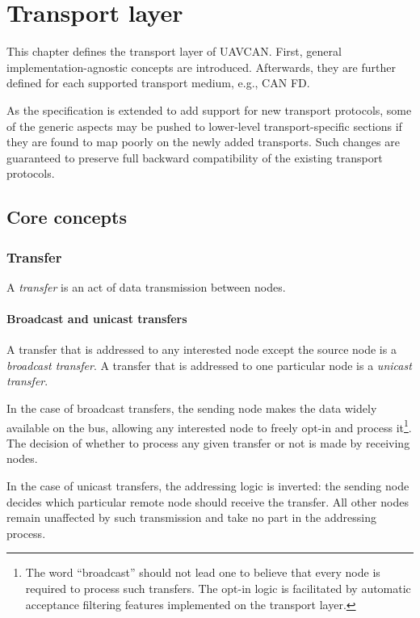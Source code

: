 \chapter{Transport layer}\label{sec:transport_layer}

This chapter defines the transport layer of UAVCAN.
First, general implementation-agnostic concepts are introduced.
Afterwards, they are further defined for each supported transport medium, e.g., CAN FD.

As the specification is extended to add support for new transport protocols,
some of the generic aspects may be pushed to lower-level transport-specific sections
if they are found to map poorly on the newly added transports.
Such changes are guaranteed to preserve full backward compatibility of the existing transport protocols.

\section{Core concepts}

\subsection{Transfer}

A \emph{transfer} is an act of data transmission between nodes.

\subsubsection{Broadcast and unicast transfers}

A transfer that is addressed to any interested node except the source node is a \emph{broadcast transfer}.
A transfer that is addressed to one particular node is a \emph{unicast transfer}.

In the case of broadcast transfers, the sending node makes the data widely available on the bus,
allowing any interested node to freely opt-in and process
it\footnote{The word ``broadcast'' should not lead one to believe that every node is required to
process such transfers. The opt-in logic is facilitated by automatic acceptance filtering features
implemented on the transport layer.}.
The decision of whether to process any given transfer or not is made by receiving nodes.

In the case of unicast transfers, the addressing logic is inverted:
the sending node decides which particular remote node should receive the transfer.
All other nodes remain unaffected by such transmission and take no part in the addressing process.

